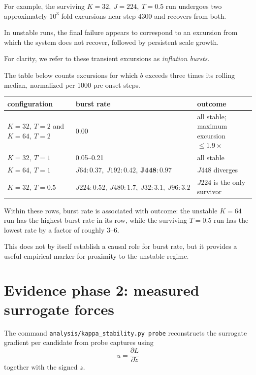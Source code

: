 \documentclass[11pt,a4paper]{article}
\newcommand{\code}[1]{\texttt{#1}}
\begin{document}
For example, the surviving \(K=32,\ J=224,\ T=0.5\) run undergoes two
approximately \(10^3\)-fold excursions near step 4300 and recovers from both.

In unstable runs, the final failure appears to correspond to an excursion from
which the system does not recover, followed by persistent scale growth.

For clarity, we refer to these transient excursions as \emph{inflation bursts}.

The table below counts excursions for which \(b\) exceeds three times its
rolling median, normalized per 1000 pre-onset steps.

\begin{center}\small
\begin{tabular}{lll}
\toprule
configuration & burst rate & outcome \\
\midrule

\(K=32,\ T=2\) and \(K=64,\ T=2\)
&
0.00
&
all stable; maximum excursion \(\le1.9\times\)
\\

\(K=32,\ T=1\)
&
0.05--0.21
&
all stable
\\

\(K=64,\ T=1\)
&
\(J64:0.37,\ J192:0.42,\ \mathbf{J448:0.97}\)
&
\(J448\) diverges
\\

\(K=32,\ T=0.5\)
&
\(J224:\mathbf{0.52},\ J480:1.7,\ J32:3.1,\ J96:3.2\)
&
\(J224\) is the only survivor
\\

\bottomrule
\end{tabular}
\end{center}

Within these rows, burst rate is associated with outcome:
the unstable \(K=64\) run has the highest burst rate in its row, while the
surviving \(T=0.5\) run has the lowest rate by a factor of roughly 3--6.

This does not by itself establish a causal role for burst rate, but it provides
a useful empirical marker for proximity to the unstable regime.


\section{Evidence phase 2: measured surrogate forces}

The command
\code{analysis/kappa\_stability.py probe}
reconstructs the surrogate gradient per candidate from probe captures using
\[
u=\frac{\partial L}{\partial \tilde z}
\]
together with the signed \(z\).
\end{document}
